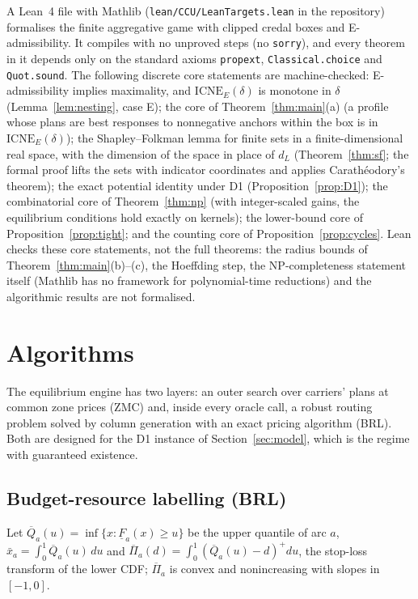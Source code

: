 \documentclass[preprint,12pt]{elsarticle}
\theoremstyle{definition}
\theoremstyle{remark}
\newcommand{\ICNE}{\mathrm{ICNE}}
\newcommand{\Qb}{\overline{Q}}
\newcommand{\Fl}{\underline{F}}
\newcommand{\Pib}{\overline{\Pi}}
\newcommand{\xb}{\bar x}
\newcommand{\pos}[1]{\left(#1\right)^{+}}
\begin{document}
A Lean~4 file with Mathlib (\texttt{lean/CCU/LeanTargets.lean} in the repository) formalises the finite aggregative game with clipped credal boxes and E-admissibility. It compiles with no unproved steps (no \texttt{sorry}), and every theorem in it depends only on the standard axioms \texttt{propext}, \texttt{Classical.choice} and \texttt{Quot.sound}. The following discrete core statements are machine-checked: E-admissibility implies maximality, and $\ICNE_E(\delta)$ is monotone in $\delta$ (Lemma~\ref{lem:nesting}, case E); the core of Theorem~\ref{thm:main}(a) (a profile whose plans are best responses to nonnegative anchors within the box is in $\ICNE_E(\delta)$); the Shapley--Folkman lemma for finite sets in a finite-dimensional real space, with the dimension of the space in place of $d_L$ (Theorem~\ref{thm:sf}; the formal proof lifts the sets with indicator coordinates and applies Carath\'eodory's theorem); the exact potential identity under D1 (Proposition~\ref{prop:D1}); the combinatorial core of Theorem~\ref{thm:np} (with integer-scaled gains, the equilibrium conditions hold exactly on kernels); the lower-bound core of Proposition~\ref{prop:tight}; and the counting core of Proposition~\ref{prop:cycles}. Lean checks these core statements, not the full theorems: the radius bounds of Theorem~\ref{thm:main}(b)--(c), the Hoeffding step, the NP-completeness statement itself (Mathlib has no framework for polynomial-time reductions) and the algorithmic results are not formalised.

\section{Algorithms}\label{sec:algo}

The equilibrium engine has two layers: an outer search over carriers' plans at common zone prices (ZMC) and, inside every oracle call, a robust routing problem solved by column generation with an exact pricing algorithm (BRL). Both are designed for the D1 instance of Section~\ref{sec:model}, which is the regime with guaranteed existence.

\subsection{Budget-resource labelling (BRL)}\label{sec:brl}

Let $\Qb_a(u)=\inf\{x:\Fl_a(x)\ge u\}$ be the upper quantile of arc $a$, $\xb_a=\int_0^1\Qb_a(u)\,du$ and $\Pib_a(d)=\int_0^1\pos{\Qb_a(u)-d}du$, the stop-loss transform of the lower CDF; $\Pib_a$ is convex and nonincreasing with slopes in $[-1,0]$.
\end{document}
